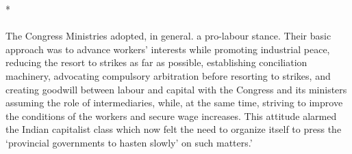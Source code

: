 \begin{center}*\end{center}

\paragraph*{}

The Congress Ministries adopted, in general. a pro-labour stance. Their basic approach was to advance workers' interests while promoting industrial peace, reducing the resort to strikes as far as possible, establishing conciliation machinery, advocating compulsory arbitration before resorting to strikes, and creating goodwill between labour and capital with the Congress and its ministers assuming the role of intermediaries, while, at the same time, striving to improve the conditions of the workers and secure wage increases. This attitude alarmed the Indian capitalist class which now felt the need to organize itself to press the `provincial governments to hasten slowly' on such matters.' 

